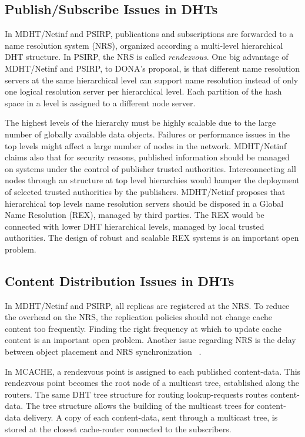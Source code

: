 \subsection{Publish/Subscribe Issues in DHTs}

In MDHT/Netinf and PSIRP, publications and subscriptions are forwarded to a name resolution system (NRS),
organized according a multi-level hierarchical DHT structure. In PSIRP, the NRS is called \emph{rendezvous}.  
One big advantage of MDHT/Netinf and PSIRP, to DONA's proposal, is that different name resolution servers at the same hierarchical level 
can support name resolution instead of only one logical resolution server per hierarchical level. Each partition of the hash space in a level 
is assigned to a different node server. 


The highest levels of the hierarchy must be highly scalable due to the large number of globally available data objects. 
Failures or performance issues in the top levels might affect a large number of nodes in the network.  MDHT/Netinf claims also that for security reasons, published information should be managed on systems under the control of 
publisher trusted authorities. Interconnecting all nodes through an structure at top level hierarchies would hamper the deployment
of selected trusted authorities by the publishers. MDHT/Netinf proposes that hierarchical top levels name resolution servers should be
disposed in a Global Name Resolution (REX), managed by third parties. The REX would be connected with lower DHT hierarchical levels,
managed by local trusted authorities. The design of robust and scalable REX systems is an important open problem. 



\subsection{Content Distribution Issues in DHTs}


In MDHT/Netinf and PSIRP, all replicas are registered at the NRS. To reduce the overhead on the NRS, the replication policies should not
change cache content too frequently. Finding the right frequency at which to update cache content is an important open problem. 
Another issue regarding NRS is the delay between object placement and NRS synchronization ~\cite{netinf}.


In MCACHE, a rendezvous point is assigned to each published content-data.  This rendezvous point  becomes the root node of
a multicast tree, established along the routers. The same DHT tree structure for routing lookup-requests routes
content-data. The tree structure allows the building of the multicast trees for content-data delivery. 
A copy of each content-data, sent through a multicast tree, is stored at the closest
cache-router connected to the subscribers. 


